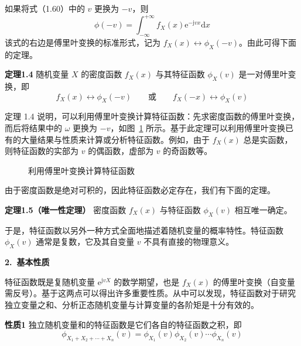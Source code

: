 \documentclass[11pt,openany,UTF8]{ctexbook}
\newcommand{\dif}{\mathrm{d}}                      %
\newcommand{\eu}{\mathrm{e}}                       %
\newcommand{\ju}{\mathrm{j}}                       %
\newcommand{\bhead}[1]{\par\medskip\noindent\textbf{#1}\par\smallskip}
\newcommand{\thm}[1]{\par\medskip\noindent\textbf{#1}\quad}
\begin{document}
如果将式（1.60\nobreak）中的 $v$ 更换为 $-v$\nobreak，则
\[
\phi(-v)=\int_{-\infty}^{+\infty}f_X(x)\eu^{-\ju vx}\dif x
\]
该式的右边是傅里叶变换的标准形式\nobreak，记为 $f_X(x)\leftrightarrow\phi_X(-v)$\nobreak。由此可得下面的定理\nobreak。

\thm{定理1.4} 随机变量 $X$ 的密度函数 $f_X(x)$ 与其特征函数 $\phi_X(v)$ 是一对傅里叶变换\nobreak，即
\[
f_X(x)\leftrightarrow\phi_X(-v)\qquad\text{或}\qquad f_X(-x)\leftrightarrow\phi_X(v)
\]

定理 1.4 说明\nobreak，可以利用傅里叶变换计算特征函数\nobreak：先求密度函数的傅里叶变换\nobreak，而后将结果中的 $\omega$ 更换为 $-v$\nobreak，如图~\ref{fig:1.13} 所示\nobreak。基于此定理可以利用傅里叶变换已有的大量结果与性质来计算或分析特征函数\nobreak。例如\nobreak，由于 $f_X(x)$ 总是实函数\nobreak，则特征函数的实部为 $v$ 的偶函数\nobreak，虚部为 $v$ 的奇函数等\nobreak。

\begin{figure}[htbp]
  \centering
  \caption{利用傅里叶变换计算特征函数}
  \label{fig:1.13}
\end{figure}

由于密度函数是绝对可积的\nobreak，因此特征函数必定存在\nobreak，我们有下面的定理\nobreak。

\thm{定理1.5（唯一性定理\nobreak）} 密度函数 $f_X(x)$ 与特征函数 $\phi_X(v)$ 相互唯一确定\nobreak。

于是\nobreak，特征函数以另外一种方式全面地描述着随机变量的概率特性\nobreak。特征函数 $\phi_X(v)$ 通常是复数\nobreak，它及其自变量 $v$ 不具有直接的物理意义\nobreak。

\bhead{2.\ 基本性质}

特征函数既是复随机变量 $\eu^{\ju vX}$ 的数学期望\nobreak，也是 $f_X(x)$ 的傅里叶变换（自变量需反号\nobreak）\nobreak。基于这两点可以得出许多重要性质\nobreak。从中可以发现\nobreak，特征函数对于研究独立变量之和\nobreak、分析正态随机变量与计算变量的各阶矩是十分有效的\nobreak。

\thm{性质1} 独立随机变量和的特征函数是它们各自的特征函数之积\nobreak，即
\begin{equation}
\phi_{X_1+X_2+\cdots+X_n}(v)=\phi_{X_1}(v)\phi_{X_2}(v)\cdots\phi_{X_n}(v)
\label{eq:1.62}
\end{equation}
\end{document}
